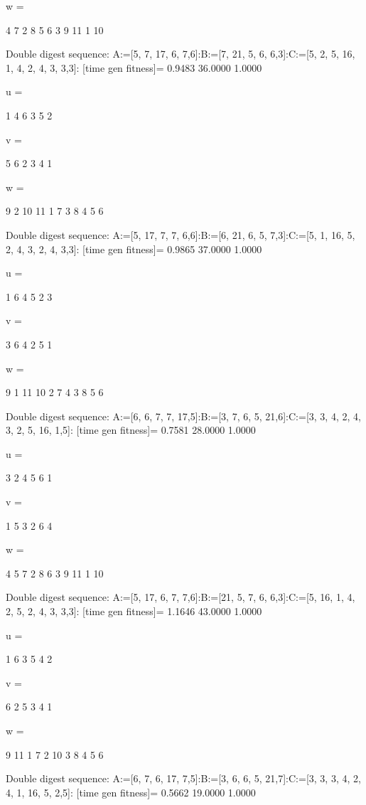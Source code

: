 w =

     4     7     2     8     5     6     3     9    11     1    10

Double digest sequence:
A:=[5, 7, 17, 6, 7,6]:B:=[7, 21, 5, 6, 6,3]:C:=[5, 2, 5, 16, 1, 4, 2, 4, 3, 3,3]:
[time gen fitness]=
    0.9483   36.0000    1.0000


u =

     1     4     6     3     5     2


v =

     5     6     2     3     4     1


w =

     9     2    10    11     1     7     3     8     4     5     6

Double digest sequence:
A:=[5, 17, 7, 7, 6,6]:B:=[6, 21, 6, 5, 7,3]:C:=[5, 1, 16, 5, 2, 4, 3, 2, 4, 3,3]:
[time gen fitness]=
    0.9865   37.0000    1.0000


u =

     1     6     4     5     2     3


v =

     3     6     4     2     5     1


w =

     9     1    11    10     2     7     4     3     8     5     6

Double digest sequence:
A:=[6, 6, 7, 7, 17,5]:B:=[3, 7, 6, 5, 21,6]:C:=[3, 3, 4, 2, 4, 3, 2, 5, 16, 1,5]:
[time gen fitness]=
    0.7581   28.0000    1.0000


u =

     3     2     4     5     6     1


v =

     1     5     3     2     6     4


w =

     4     5     7     2     8     6     3     9    11     1    10

Double digest sequence:
A:=[5, 17, 6, 7, 7,6]:B:=[21, 5, 7, 6, 6,3]:C:=[5, 16, 1, 4, 2, 5, 2, 4, 3, 3,3]:
[time gen fitness]=
    1.1646   43.0000    1.0000


u =

     1     6     3     5     4     2


v =

     6     2     5     3     4     1


w =

     9    11     1     7     2    10     3     8     4     5     6

Double digest sequence:
A:=[6, 7, 6, 17, 7,5]:B:=[3, 6, 6, 5, 21,7]:C:=[3, 3, 3, 4, 2, 4, 1, 16, 5, 2,5]:
[time gen fitness]=
    0.5662   19.0000    1.0000


